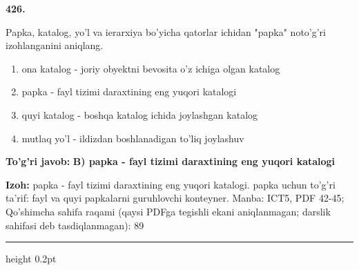 \documentclass[10pt,a4paper]{article}
\begin{document}
{\bfseries\sffamily\color{ink} 426.}
\par
Papka, katalog, yo'l va ierarxiya bo'yicha qatorlar ichidan "papka" noto'g'ri izohlanganini aniqlang.
\begin{enumerate}[label=\Alph*),leftmargin=9mm]
\item ona katalog - joriy obyektni bevosita o'z ichiga olgan katalog
\item papka - fayl tizimi daraxtining eng yuqori katalogi
\item quyi katalog - boshqa katalog ichida joylashgan katalog
\item mutlaq yo'l - ildizdan boshlanadigan to'liq joylashuv
\end{enumerate}
\begin{tcolorbox}[enhanced,breakable,colback=teal!4,colframe=teal!60!black,boxrule=0.45pt,arc=1.2mm,left=2.7mm,right=2.7mm,top=1.8mm,bottom=1.8mm,before skip=2mm,after skip=2mm]
{\bfseries\sffamily\color{teal}To'g'ri javob:} \textbf{B) papka - fayl tizimi daraxtining eng yuqori katalogi}
\par\smallskip
{\bfseries Izoh:} papka - fayl tizimi daraxtining eng yuqori katalogi. papka uchun to'g'ri ta'rif: fayl va quyi papkalarni guruhlovchi konteyner. Manba: ICT5, PDF 42-45; Qo'shimcha sahifa raqami (qaysi PDFga tegishli ekani aniqlanmagan; darslik sahifasi deb tasdiqlanmagan): 89
\end{tcolorbox}
\vspace{2mm}\hrule height 0.2pt\vspace{3mm}
\end{document}
